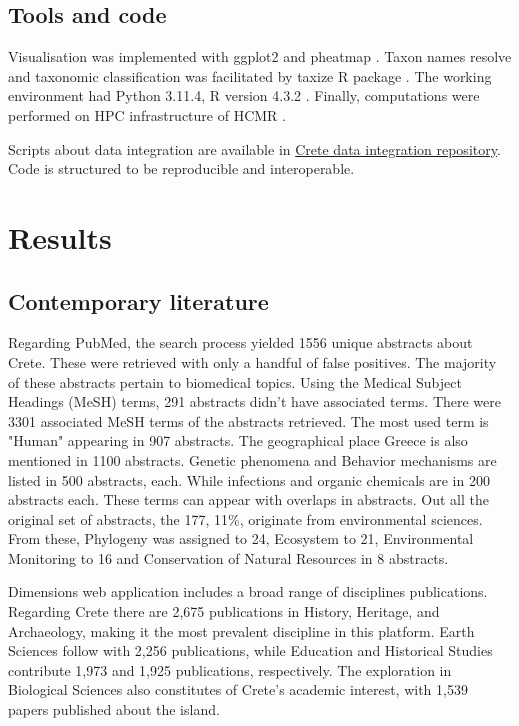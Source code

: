 \subsection{Tools and code}\label{Coding environment}
Visualisation was implemented with ggplot2 \parencite{wickham_ggplot2_2016} and pheatmap \parencite{Kolde2019}.
Taxon names resolve and taxonomic classification was facilitated by taxize R package \parencite{chamberlain_taxize_2013}.
The working environment had Python 3.11.4, R version 4.3.2 \parencite{rcoreteam}.
Finally, computations were performed on HPC infrastructure of HCMR \parencite{zafeiropoulos_0s_2021}.

Scripts about data integration are available in
\href{https://github.com/savvas-paragkamian/crete-data-integration}{Crete data integration repository}.
Code is structured to be reproducible and interoperable.

\section{Results}\label{crete_idea_results}

\subsection{Contemporary literature}

Regarding PubMed, the search process yielded 1556 unique abstracts about Crete.
These were retrieved with only a handful of false positives.
The majority of these abstracts pertain to biomedical topics.
Using the Medical Subject Headings (MeSH) terms, 291 abstracts didn't have associated terms. 
There were 3301 associated MeSH terms of the abstracts retrieved. 
The most used term is "Human" appearing in 907 abstracts. The geographical 
place Greece is also mentioned in 1100 abstracts. Genetic phenomena
and Behavior mechanisms are listed in 500 abstracts, each. 
While infections and organic chemicals are in 200 abstracts each. These terms 
can appear with overlaps in abstracts.
Out all the original set of abstracts, the 177, 11\%, originate from environmental sciences.
From these, Phylogeny was assigned to 24, Ecosystem to 21, Environmental Monitoring to 16
and Conservation of Natural Resources in 8 abstracts.

Dimensions web application includes a broad range of disciplines publications.
Regarding Crete there are 2,675 publications in History, Heritage, and Archaeology,
making it the most prevalent discipline in this platform.
Earth Sciences follow with 2,256 publications, while Education and Historical
Studies contribute 1,973 and 1,925 publications, respectively.
The exploration in Biological Sciences also constitutes of
Crete's academic interest, with 1,539 papers published about the island.

